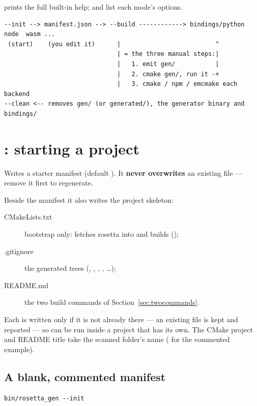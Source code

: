  prints the full built-in help; 
and  list each mode's options.

\begin{lstlisting}[style=plain]
--init --> manifest.json --> --build ------------> bindings/python  node  wasm ...
 (start)    (you edit it)      |                          ^
                               | = the three manual steps:|
                               |   1. emit gen/           |
                               |   2. cmake gen/, run it -+
                               |   3. cmake / npm / emcmake each backend
--clean <-- removes gen/ (or generated/), the generator binary and bindings/
\end{lstlisting}

\section{: starting a project}
\label{sec:init}

Writes a starter manifest (default ). It \textbf{never
overwrites} an existing file --- remove it first to regenerate.

Beside the manifest it also writes the project skeleton:

\begin{description}
  \item[CMakeLists.txt] bootstrap only: fetches rosetta into  and
    builds  ();
  \item[.gitignore] the generated trees (, ,
    , , \ldots);
  \item[README.md] the two build commands of Section~\ref{sec:twocommands}.
\end{description}

Each is written only if it is not already there --- an existing file is kept
and reported --- so  can be run inside a project that has its own.
The CMake project and README title take the scanned folder's name
( for the commented example).

\subsection*{A blank, commented manifest}

\begin{lstlisting}[style=sh]
bin/rosetta_gen --init
\end{lstlisting}

